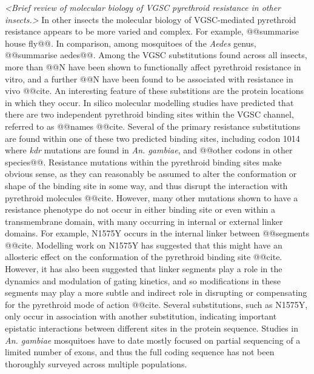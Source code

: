 \documentclass[a4paper,11pt,abstracton,hidelinks]{scrartcl}
\begin{document}
\textit{<Brief review of molecular biology of VGSC pyrethroid resistance in other insects.>}
%
In other insects the molecular biology of VGSC-mediated pyrethroid resistance appears to be more varied and complex.
%
For example, @@summarise house fly@@.
%
In comparison, among mosquitoes of the \textit{Aedes} genus, @@summarise aedes@@.
%
Among the VGSC substitutions found across all insects, more than @@N have been shown to functionally affect pyrethroid resistance in vitro, and a further @@N have been found to be associated with resistance in vivo @@cite.
%
An interesting feature of these substitions are the protein locations in which they occur.
%
In silico molecular modelling studies have predicted that there are two independent pyrethroid binding sites within the VGSC channel, referred to as @@names @@cite.
%
Several of the primary resistance substitutions are found within one of these two predicted binding sites, including codon 1014 where \textit{kdr} mutations are found in \textit{An. gambiae}, and @@other codons in other species@@.
%
Resistance mutations within the pyrethroid binding sites make obvious sense, as they can reasonably be assumed to alter the conformation or shape of the binding site in some way, and thus disrupt the interaction with pyrethroid molecules @@cite.
%
However, many other mutations shown to have a resistance phenotype do not occur in either binding site or even within a transmembrane domain, with many occurring in internal or external linker domains.
%
For example, N1575Y occurs in the internal linker between @@segments @@cite.
%
Modelling work on N1575Y has suggested that this might have an allosteric effect on the conformation of the pyrethroid binding site @@cite.
%
However, it has also been suggested that linker segments play a role in the dynamics and modulation of gating kinetics, and so modifications in these segments may play a more subtle and indirect role in disrupting or compensating for the pyrethroid mode of action @@cite.
%
Several substitutions, such as N1575Y, only occur in association with another substitution, indicating important epistatic interactions between different sites in the protein sequence.
%
Studies in \textit{An. gambiae} mosquitoes have to date mostly focused on partial sequencing of a limited number of exons, and thus the full coding sequence has not been thoroughly surveyed across multiple populations.
\end{document}
